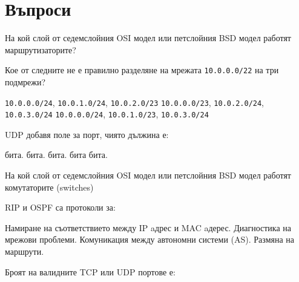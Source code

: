 \section*{Въпроси}

\begin{questions}

  \question[6] На кой слой от седемслойния OSI модел или петслойния BSD модел
  работят маршрутизаторите?
  \begin{oneparchoices}
  \end{oneparchoices}

  \question[10] Кое от следните не е правилно разделяне на мрежата
  \texttt{10.0.0.0/22} на три подмрежи?
  \begin{choices}
    \choice \texttt{10.0.0.0/24}, \texttt{10.0.1.0/24}, \texttt{10.0.2.0/23}
    \choice \texttt{10.0.0.0/23}, \texttt{10.0.2.0/24}, \texttt{10.0.3.0/24}
    \CorrectChoice \texttt{10.0.0.0/24}, \texttt{10.0.1.0/23}, \texttt{10.0.3.0/24}
  \end{choices}

  \question[6] UDP добавя поле за порт, чиято дължина е:
  \begin{oneparchoices}
     бита.
     бита.
     бита.
     бита
     бита.
  \end{oneparchoices}

  \question[6] На кой слой от седемслойния OSI модел или петслойния BSD модел
  работят комутаторите (\foreignlanguage{english}{switches})
  \begin{oneparchoices}
  \end{oneparchoices}

  \question[6] RIP и OSPF са протоколи за:
  \begin{choices}
    \choice Намиране на съответствието между IP aдрес и MAC aдерес.
    \choice Диагностика на мрежови проблеми.
    \choice Комуникация между автономни системи (AS).
    \CorrectChoice Размяна на маршрути.
  \end{choices}

  \question[6] Броят на валидните TCP или UDP портове е:
  \begin{oneparchoices}
  \end{oneparchoices}


\end{questions}

